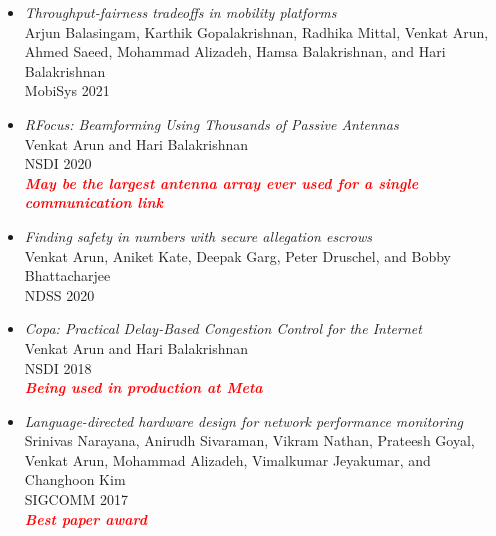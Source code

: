 \documentclass[notitlepage]{article}
\newcommand{\highlight}[1]{\textcolor{red}{\textit{\textbf{#1}}}}
\begin{document}
\begin{itemize}[noitemsep,nolistsep]
              \item {\it Throughput-fairness tradeoffs in mobility platforms}\label{paper:drones}\\
      Arjun Balasingam, Karthik Gopalakrishnan, Radhika Mittal, Venkat Arun, Ahmed Saeed, Mohammad Alizadeh, Hamsa Balakrishnan, and Hari Balakrishnan\\
      MobiSys 2021\\
              \item {\it RFocus: Beamforming Using Thousands of Passive Antennas}\label{paper:rfocus}\\
      Venkat Arun and Hari Balakrishnan\\
      NSDI 2020\\
              \highlight{May be the largest antenna array ever used for a single communication link}\\
              \item {\it Finding safety in numbers with secure allegation escrows}\label{paper:sae}\\
      Venkat Arun, Aniket Kate, Deepak Garg, Peter Druschel, and Bobby Bhattacharjee\\
      NDSS 2020\\
              \item {\it Copa: Practical Delay-Based Congestion Control for the Internet}\label{paper:copa}\\
      Venkat Arun and Hari Balakrishnan\\
      NSDI 2018\\
              \highlight{Being used in production at Meta}\\
              \item {\it Language-directed hardware design for network performance monitoring}\label{paper:marple}\\
      Srinivas Narayana, Anirudh Sivaraman, Vikram Nathan, Prateesh Goyal, Venkat Arun, Mohammad Alizadeh, Vimalkumar Jeyakumar, and Changhoon Kim\\
      SIGCOMM 2017\\
              \highlight{Best paper award}\\
        \end{itemize}
\end{document}

